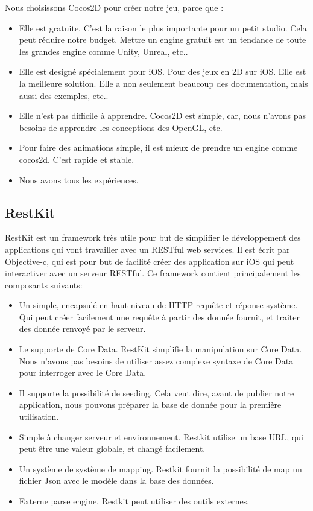 Nous choisissons Cocos2D pour créer notre jeu, parce que :
\begin{itemize}
	\item Elle est gratuite. C'est la raison le plus importante pour un petit studio. Cela peut réduire notre budget. Mettre un engine gratuit est un tendance de toute les grandes engine comme Unity, Unreal, etc..
	\item Elle est designé spécialement pour iOS. Pour des jeux en 2D sur iOS. Elle est la meilleure solution. Elle a non seulement beaucoup des documentation, mais aussi des exemples, etc..
	\item Elle n'est pas difficile à apprendre. Cocos2D est simple, car, nous n'avons pas besoins de apprendre les conceptions des OpenGL, etc.
	\item Pour faire des animations simple, il est mieux de prendre un engine comme cocos2d. C'est rapide et stable.
	\item Nous avons tous les expériences.
\end{itemize}

\subsection{RestKit} %



RestKit est un framework très utile pour but de simplifier le développement des applications qui vont travailler avec un RESTful web services. Il est écrit par Objective-c, qui est pour but de facilité créer des application sur iOS qui peut interactiver avec un serveur RESTful. Ce framework contient principalement les composants suivants:
\begin{itemize}
	\item Un simple, encapsulé en haut niveau de HTTP requête et réponse système. Qui peut créer facilement une requête à partir des donnée fournit, et traiter des donnée renvoyé par le serveur.
	\item Le supporte de Core Data. RestKit simplifie la manipulation sur Core Data. Nous n'avons pas besoins de utiliser assez complexe syntaxe de Core Data pour interroger avec le Core Data.
	\item Il supporte la possibilité de seeding. Cela veut dire, avant de publier notre application, nous pouvons préparer la base de donnée pour la première utilisation.
	\item Simple à changer serveur et environnement. Restkit utilise un base URL, qui peut être une valeur globale, et changé facilement.
	\item Un système de système de mapping. Restkit fournit la possibilité de map un fichier Json avec le modèle dans la base des données. 
	\item Externe parse engine. Restkit peut utiliser des outils externes. 
\end{itemize}

